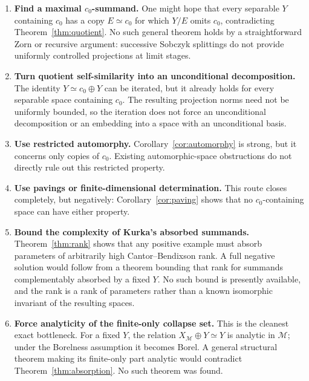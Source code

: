\documentclass[11pt]{article}
\theoremstyle{definition}
\newcommand{\czer}{c_0}
\newcommand{\iso}{\simeq}
\begin{document}
\begin{enumerate}[leftmargin=2.1em,itemsep=0.55em]
\item \textbf{Find a maximal \(\czer\)-summand.}
One might hope that every separable \(Y\) containing \(\czer\) has a copy
\(E\iso\czer\) for which \(Y/E\) omits \(\czer\), contradicting
Theorem~\ref{thm:quotient}.  No such general theorem holds by a straightforward
Zorn or recursive argument: successive Sobczyk splittings do not provide
uniformly controlled projections at limit stages.

\item \textbf{Turn quotient self-similarity into an unconditional
decomposition.}
The identity \(Y\iso\czer\oplus Y\) can be iterated, but it already holds for
every separable space containing \(\czer\).  The resulting projection norms
need not be uniformly bounded, so the iteration does not force an
unconditional decomposition or an embedding into a space with an
unconditional basis.

\item \textbf{Use restricted automorphy.}
Corollary~\ref{cor:automorphy} is strong, but it concerns only copies of
\(\czer\).  Existing automorphic-space obstructions do not directly rule out
this restricted property.

\item \textbf{Use pavings or finite-dimensional determination.}
This route closes completely, but negatively: Corollary~\ref{cor:paving}
shows that no \(\czer\)-containing space can have either property.

\item \textbf{Bound the complexity of Kurka's absorbed summands.}
Theorem~\ref{thm:rank} shows that any positive example must absorb parameters
of arbitrarily high Cantor--Bendixson rank.  A full negative solution would
follow from a theorem bounding that rank for summands complementably absorbed
by a fixed \(Y\).  No such bound is presently available, and the rank is a
rank of parameters rather than a known isomorphic invariant of the resulting
spaces.

\item \textbf{Force analyticity of the finite-only collapse set.}
This is the cleanest exact bottleneck.  For a fixed \(Y\), the relation
\(X_{\mathcal M}\oplus Y\iso Y\) is analytic in \(\mathcal M\); under the
Borelness assumption it becomes Borel.  A general structural theorem making
its finite-only part analytic would contradict
Theorem~\ref{thm:absorption}.  No such theorem was found.
\end{enumerate}
\end{document}
